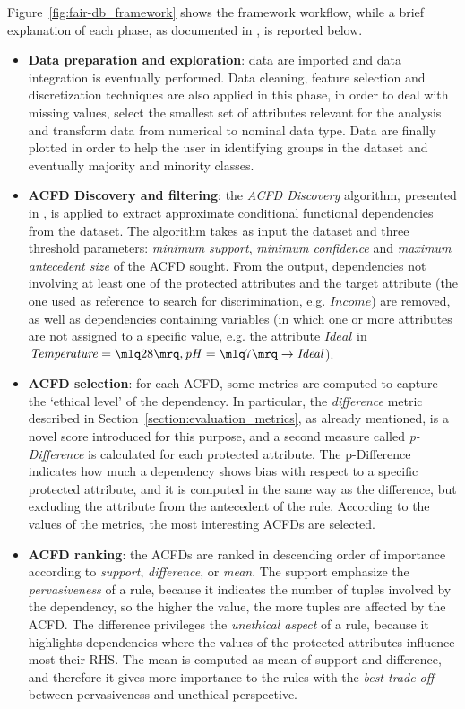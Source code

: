 Figure~\ref{fig:fair-db_framework} shows the framework workflow, while a brief explanation of each phase, as documented in \cite{azzalini2021fair}, is reported below.
\begin{itemize}
\item \textbf{Data preparation and exploration}: data are imported and data integration is eventually performed. Data cleaning, feature selection and discretization techniques are also applied in this phase, in order to deal with missing values, select the smallest set of attributes relevant for the analysis and transform data from numerical to nominal data type. Data are finally plotted in order to help the user in identifying groups in the dataset and eventually majority and minority classes.
\item \textbf{ACFD Discovery and filtering}: the \textit{ACFD Discovery} algorithm, presented in \cite{rammelaere2018revisiting}, is applied to extract approximate conditional functional dependencies from the dataset. The algorithm takes as input the dataset and three threshold parameters: \textit{minimum support}, \textit{minimum confidence} and \textit{maximum antecedent size} of the ACFD sought. From the output, dependencies not involving at least one of the protected attributes and the target attribute (the one used as reference to search for discrimination, e.g. \(\mathit{Income}\)) are removed, as well as dependencies containing variables (in which one or more attributes are not assigned to a specific value, e.g. the attribute \(\mathit{Ideal}\) in \(\mathit{Temperature} = \mlq 28 \mrq, \mathit{pH} = \mlq 7 \mrq \rightarrow \mathit{Ideal}\)).
\item \textbf{ACFD selection}: for each ACFD, some metrics are computed to capture the `ethical level' of the dependency. In particular, the \textit{difference} metric described in Section~\ref{section:evaluation_metrics}, as already mentioned, is a novel score introduced for this purpose, and a second measure called \textit{p-Difference} is calculated for each protected attribute. The p-Difference indicates how much a dependency shows bias with respect to a specific protected attribute, and it is computed in the same way as the difference, but excluding the attribute from the antecedent of the rule. According to the values of the metrics, the most interesting ACFDs are selected.
\item \textbf{ACFD ranking}: the ACFDs are ranked in descending order of importance according to \textit{support}, \textit{difference}, or \textit{mean}. The support emphasize the \textit{pervasiveness} of a rule, because it indicates the number of tuples involved by the dependency, so the higher the value, the more tuples are affected by the ACFD. The difference privileges the \textit{unethical aspect} of a rule, because it highlights dependencies where the values of the protected attributes influence most their RHS. The mean is computed as mean of support and difference, and therefore it gives more importance to the rules with the \textit{best trade-off} between pervasiveness and unethical perspective.

\end{itemize}
